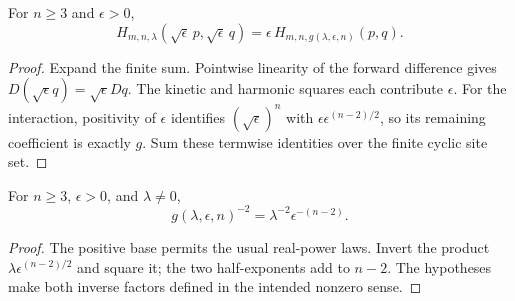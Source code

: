 \begin{theorem}
\label{thm:hamiltonian:lattice-rescale}
For $n\ge3$ and $\epsilon>0$,
\[
 H_{m,n,\lambda}(\sqrt\epsilon\,p,\sqrt\epsilon\,q)
 =\epsilon\,H_{m,n,g(\lambda,\epsilon,n)}(p,q).
\]
\end{theorem}
\begin{proof}

\leanok
Expand the finite sum.  Pointwise linearity of the forward difference gives
$D(\sqrt\epsilon q)=\sqrt\epsilon Dq$.  The kinetic and harmonic squares
each contribute $\epsilon$.  For the interaction, positivity of $\epsilon$
identifies $(\sqrt\epsilon)^n$ with
$\epsilon\epsilon^{(n-2)/2}$, so its remaining coefficient is exactly $g$.
Sum these termwise identities over the finite cyclic site set.
\end{proof}

\begin{theorem}
\label{thm:hamiltonian:effective-coupling-inv-sq}
For $n\ge3$, $\epsilon>0$, and $\lambda\ne0$,
\[
 g(\lambda,\epsilon,n)^{-2}
 =\lambda^{-2}\epsilon^{-(n-2)}.
\]
\end{theorem}
\begin{proof}

\leanok
The positive base permits the usual real-power laws.  Invert the product
$\lambda\epsilon^{(n-2)/2}$ and square it; the two half-exponents add to
$n-2$.  The hypotheses make both inverse factors defined in the intended
nonzero sense.
\end{proof}
